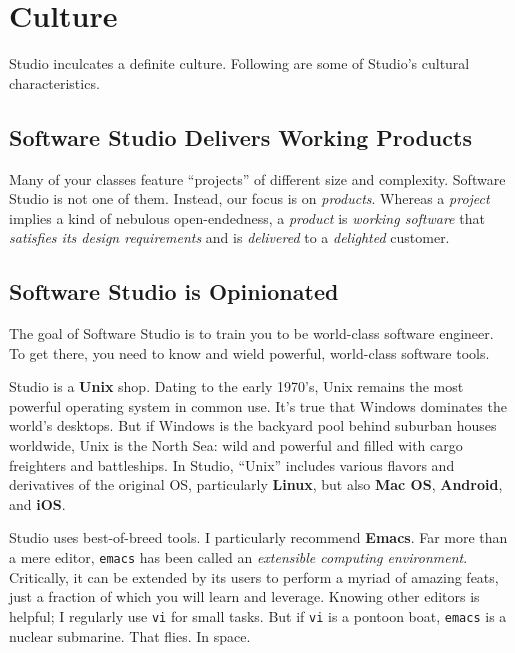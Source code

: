 \documentclass{article}
\begin{document}
\section{Culture}
\label{sec:orgheadline9}
Studio inculcates a definite culture.
Following are some of Studio's cultural characteristics.

\subsection{Software Studio Delivers Working Products}
\label{sec:orgheadline3}
Many of your classes feature ``projects'' of different size and complexity.
Software Studio is not one of them.
Instead, our focus is on \emph{products}.
Whereas a \emph{project} implies a kind of nebulous open-endedness,
a \emph{product} is
\emph{working software}
that \emph{satisfies its design requirements}
and is \emph{delivered} to a \emph{delighted} customer.

\subsection{Software Studio is Opinionated}
\label{sec:orgheadline4}
The goal of Software Studio is to train you to be world-class software engineer.
To get there, you need to know and wield powerful, world-class software tools.

Studio is a \textbf{Unix} shop.
Dating to the early 1970's,
Unix remains the most powerful operating system in common use.
It's true that Windows dominates the world's desktops.
But if Windows is the backyard pool behind suburban houses worldwide,
Unix is the North Sea: wild and powerful and
filled with cargo freighters and battleships.
In Studio, ``Unix'' includes various flavors and derivatives of the original OS,
particularly \textbf{Linux}, but also \textbf{Mac OS}, \textbf{Android}, and \textbf{iOS}.

Studio uses best-of-breed tools.
I particularly recommend \textbf{Emacs}.
Far more than a mere editor,
\texttt{emacs} has been called an \emph{extensible computing environment}.
Critically, it can be extended by its users to perform a myriad of amazing feats,
just a fraction of which you will learn and leverage.
Knowing other editors is helpful; I regularly use \texttt{vi} for small tasks.
But if \texttt{vi} is a pontoon boat,
\texttt{emacs} is a nuclear submarine. That flies. In space.
\end{document}
